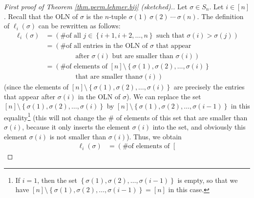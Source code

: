 \begin{proof}
[First proof of Theorem \ref{thm.perm.lehmer.bij} (sketched).]Let $\sigma\in
S_{n}$. Let $i\in\left[  n\right]  $. Recall that the OLN of $\sigma$ is the
$n$-tuple $\sigma\left(  1\right)  \ \sigma\left(  2\right)  \ \cdots
\ \sigma\left(  n\right)  $. The definition of $\ell_{i}\left(  \sigma\right)
$ can be rewritten as follows:%
\begin{align*}
\ell_{i}\left(  \sigma\right)   &  =\left(  \text{\# of all }j\in\left\{
i+1,i+2,\ldots,n\right\}  \text{ such that }\sigma\left(  i\right)
>\sigma\left(  j\right)  \right) \\
&  =\left(  \text{\# of all entries in the OLN of }\sigma\text{ that
appear}\right. \\
&  \ \ \ \ \ \ \ \ \ \ \ \ \ \ \ \ \ \ \ \ \left.  \text{after }\sigma\left(
i\right)  \text{ but are smaller than }\sigma\left(  i\right)  \right) \\
&  =\left(  \text{\# of elements of }\left[  n\right]  \setminus\left\{
\sigma\left(  1\right)  ,\sigma\left(  2\right)  ,\ldots,\sigma\left(
i\right)  \right\}  \right. \\
&  \ \ \ \ \ \ \ \ \ \ \ \ \ \ \ \ \ \ \ \ \left.  \text{that are smaller than
}\sigma\left(  i\right)  \right)
\end{align*}
(since the elements of $\left[  n\right]  \setminus\left\{  \sigma\left(
1\right)  ,\sigma\left(  2\right)  ,\ldots,\sigma\left(  i\right)  \right\}  $
are precisely the entries that appear after $\sigma\left(  i\right)  $ in the
OLN of $\sigma$). We can replace the set $\left[  n\right]  \setminus\left\{
\sigma\left(  1\right)  ,\sigma\left(  2\right)  ,\ldots,\sigma\left(
i\right)  \right\}  $ by $\left[  n\right]  \setminus\left\{  \sigma\left(
1\right)  ,\sigma\left(  2\right)  ,\ldots,\sigma\left(  i-1\right)  \right\}
$ in this equality\footnote{If $i=1$, then the set $\left\{  \sigma\left(
1\right)  ,\sigma\left(  2\right)  ,\ldots,\sigma\left(  i-1\right)  \right\}
$ is empty, so that we have $\left[  n\right]  \setminus\left\{  \sigma\left(
1\right)  ,\sigma\left(  2\right)  ,\ldots,\sigma\left(  i-1\right)  \right\}
=\left[  n\right]  $ in this case.} (this will not change the \# of elements
of this set that are smaller than $\sigma\left(  i\right)  $, because it only
inserts the element $\sigma\left(  i\right)  $ into the set, and obviously
this element $\sigma\left(  i\right)  $ is not smaller than $\sigma\left(
i\right)  $). Thus, we obtain%
\begin{align}
\ell_{i}\left(  \sigma\right)   &  =\left(  \text{\# of elements of }\left[

\end{align}
\end{proof}
